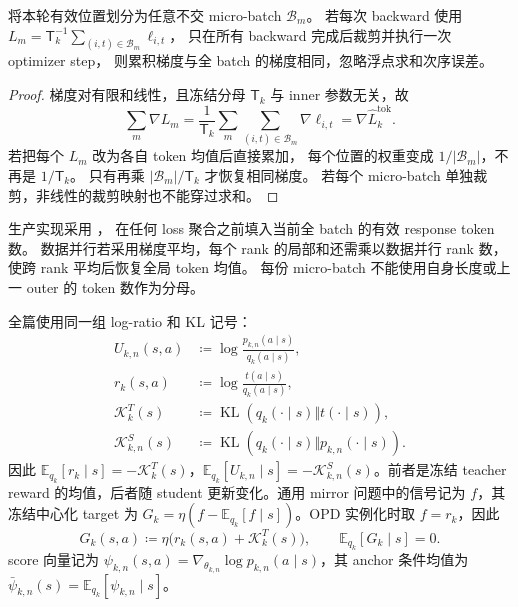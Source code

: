 \documentclass[lang=cn,scheme=chinese,openany]{../book/elegantbook}
\newcommand{\KL}{\operatorname{KL}}
\begin{document}
\begin{proposition}
将本轮有效位置划分为任意不交 micro-batch $\mathcal B_m$。
若每次 backward 使用
$L_m=\mathsf T_k^{-1}\sum_{(i,t)\in\mathcal B_m}\ell_{i,t}$，
只在所有 backward 完成后裁剪并执行一次 optimizer step，
则累积梯度与全 batch 的梯度相同，忽略浮点求和次序误差。
\end{proposition}
\begin{proof}
梯度对有限和线性，且冻结分母 $\mathsf T_k$ 与 inner 参数无关，故
\begin{equation}
 \sum_m\nabla L_m
 =\frac1{\mathsf T_k}\sum_m\sum_{(i,t)\in\mathcal B_m}\nabla\ell_{i,t}
 =\nabla\widehat L_k^{\mathrm{tok}}.
\end{equation}
若把每个 $L_m$ 改为各自 token 均值后直接累加，
每个位置的权重变成 $1/|\mathcal B_m|$，不再是 $1/\mathsf T_k$。
只有再乘 $|\mathcal B_m|/\mathsf T_k$ 才恢复相同梯度。
若每个 micro-batch 单独裁剪，非线性的裁剪映射也不能穿过求和。
\end{proof}

生产实现采用 ，
在任何 loss 聚合之前填入当前全 batch 的有效 response token 数。
数据并行若采用梯度平均，每个 rank 的局部和还需乘以数据并行 rank 数，
使跨 rank 平均后恢复全局 token 均值。
每份 micro-batch 不能使用自身长度或上一 outer 的 token 数作为分母。



全篇使用同一组 log-ratio 和 KL 记号：
\begin{align}
U_{k,n}(s,a)&\coloneqq\log\frac{ p_{k,n}(a\mid s)}{ q_k(a\mid s)},\\
r_k(s,a)&\coloneqq\log\frac{ t(a\mid s)}{ q_k(a\mid s)},\\
\mathcal K_k^T(s)&\coloneqq\KL\!\left( q_k(\cdot\mid s)\Vert t(\cdot\mid s)\right),\\
\mathcal K_{k,n}^S(s)&\coloneqq\KL\!\left( q_k(\cdot\mid s)\Vert p_{k,n}(\cdot\mid s)\right).
\end{align}
因此 $\mathbb E_{ q_k}[r_k\mid s]=-\mathcal K_k^T(s)$，$\mathbb E_{ q_k}[U_{k,n}\mid s]=-\mathcal K_{k,n}^S(s)$。前者是冻结 teacher reward 的均值，后者随 student 更新变化。通用 mirror 问题中的信号记为 $f$，其冻结中心化 target 为 $G_k=\eta(f-\mathbb E_{ q_k}[f\mid s])$。OPD 实例化时取 $f=r_k$，因此
\begin{equation}
G_k(s,a)\coloneqq\eta\bigl(r_k(s,a)+\mathcal K_k^T(s)\bigr),
\qquad\mathbb E_{ q_k}[G_k\mid s]=0.
\end{equation}
score 向量记为 $\psi_{k,n}(s,a)=\nabla_{\theta_{k,n}}\log p_{k,n}(a\mid s)$，其 anchor 条件均值为 $\bar\psi_{k,n}(s)=\mathbb E_{ q_k}[\psi_{k,n}\mid s]$。
\end{document}
